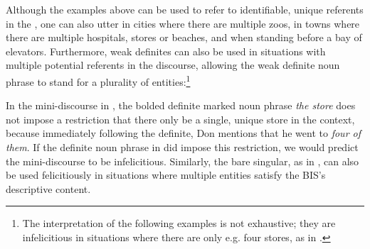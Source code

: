 \documentclass[output=paper,
modfonts
]{langscibook}
\begin{document}
 \begin{exe}
 \end{exe}
 
Although the examples above can be used to refer to identifiable, unique referents in the , one can also utter  in cities where there are multiple zoos,  in towns where there are multiple hospitals, stores or beaches, and  when standing before a bay of elevators. Furthermore, weak definites can also be used in situations with multiple potential referents in the discourse, allowing the weak definite noun phrase to stand for a plurality of entities:\footnote{The interpretation of the following examples is not exhaustive; they are infelicitious in situations where there are only e.g. four stores, as in .}

\begin{exe}
\end{exe}

In the mini-discourse in , the bolded definite marked noun phrase \textit{the store} does not impose a restriction that there only be a single, unique store in the context, because immediately following the definite, Don mentions that he went to \textit{four of them}. If the definite noun phrase in  did impose this restriction, we would predict the mini-discourse to be infelicitious. Similarly, the bare singular, as in , can also be used felicitiously in situations where multiple entities satisfy the BIS's descriptive content. 

\begin{exe}
\end{exe}
\end{document}

